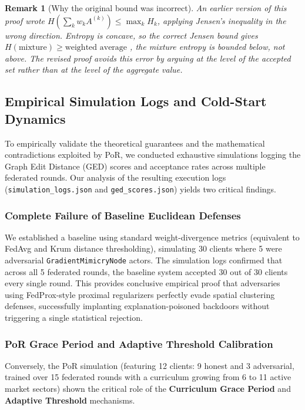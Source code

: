 \documentclass[journal]{IEEEtran}
\newtheorem{remark}{Remark}
\begin{document}
\begin{remark}[Why the original bound was incorrect]
An earlier version of this proof wrote $H(\sum_k w_k A^{(k)}) \le \max_k H_k$, applying Jensen's inequality in the wrong direction. Entropy is \emph{concave}, so the correct Jensen bound gives $H(\text{mixture}) \ge \text{weighted average}$ , the mixture entropy is bounded \emph{below}, not above. The revised proof avoids this error by arguing at the level of the accepted \emph{set} rather than at the level of the aggregate value. \end{remark}


\subsection{Empirical Simulation Logs and Cold-Start Dynamics}

To empirically validate the theoretical guarantees and the mathematical contradictions exploited by PoR, we conducted exhaustive simulations logging the Graph Edit Distance (GED) scores and acceptance rates across multiple federated rounds. Our analysis of the resulting execution logs (\texttt{simulation\_logs.json} and \texttt{ged\_scores.json}) yields two critical findings.

\subsubsection{Complete Failure of Baseline Euclidean Defenses}
We established a baseline using standard weight-divergence metrics (equivalent to FedAvg and Krum distance thresholding), simulating 30 clients where 5 were adversarial \texttt{GradientMimicryNode} actors. The simulation logs confirmed that across all 5 federated rounds, the baseline system accepted 30 out of 30 clients every single round. This provides conclusive empirical proof that adversaries using FedProx-style proximal regularizers perfectly evade spatial clustering defenses, successfully implanting explanation-poisoned backdoors without triggering a single statistical rejection.

\subsubsection{PoR Grace Period and Adaptive Threshold Calibration}
Conversely, the PoR simulation (featuring 12 clients: 9 honest and 3 adversarial, trained over 15 federated rounds with a curriculum growing from 6 to 11 active market sectors) shown the critical role of the \textbf{Curriculum Grace Period} and \textbf{Adaptive Threshold} mechanisms.
\end{document}

